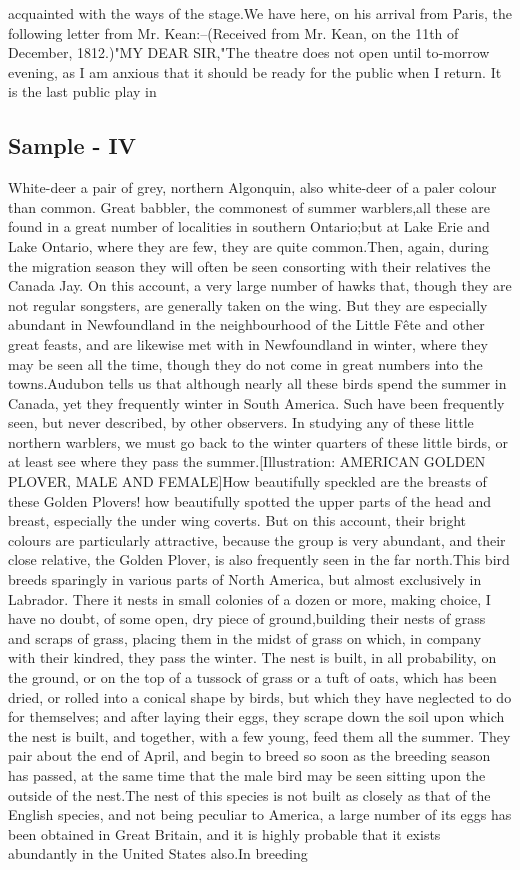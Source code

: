 \documentclass[a4paper]{article}
\begin{document}
acquainted with the ways of the stage.We have here, on his arrival from Paris, the following letter from Mr. Kean:--(Received from Mr. Kean, on the 11th of December, 1812.)"MY DEAR SIR,"The theatre does not open until to-morrow evening, as I am anxious that it should be ready for the public when I return. It is the last public play in


\subsection{Sample - IV}
White-deer a pair of grey, northern Algonquin, also white-deer of a paler colour than common. Great babbler, the commonest of summer warblers,all these are found in a great number of localities in southern Ontario;but at Lake Erie and Lake Ontario, where they are few, they are quite common.Then, again, during the migration season they will often be seen consorting with their relatives the Canada Jay. On this account, a very large number of hawks that, though they are not regular songsters, are generally taken on the wing. But they are especially abundant in Newfoundland in the neighbourhood of the Little Fête and other great feasts, and are likewise met with in Newfoundland in winter, where they may be seen all the time, though they do not come in great numbers into the towns.Audubon tells us that although nearly all these birds spend the summer in Canada, yet they frequently winter in South America. Such have been frequently seen, but never described, by other observers. In studying any of these little northern warblers, we must go back to the winter quarters of these little birds, or at least see where they pass the summer.[Illustration: AMERICAN GOLDEN PLOVER, MALE AND FEMALE]How beautifully speckled are the breasts of these Golden Plovers! how beautifully spotted the upper parts of the head and breast, especially the under wing coverts. But on this account, their bright colours are particularly attractive, because the group is very abundant, and their close relative, the Golden Plover, is also frequently seen in the far north.This bird breeds sparingly in various parts of North America, but almost exclusively in Labrador. There it nests in small colonies of a dozen or more, making choice, I have no doubt, of some open, dry piece of ground,building their nests of grass and scraps of grass, placing them in the midst of grass on which, in company with their kindred, they pass the winter. The nest is built, in all probability, on the ground, or on the top of a tussock of grass or a tuft of oats, which has been dried, or rolled into a conical shape by birds, but which they have neglected to do for themselves; and after laying their eggs, they scrape down the soil upon which the nest is built, and together, with a few young, feed them all the summer. They pair about the end of April, and begin to breed so soon as the breeding season has passed, at the same time that the male bird may be seen sitting upon the outside of the nest.The nest of this species is not built as closely as that of the English species, and not being peculiar to America, a large number of its eggs has been obtained in Great Britain, and it is highly probable that it exists abundantly in the United States also.In breeding 
\end{document}
